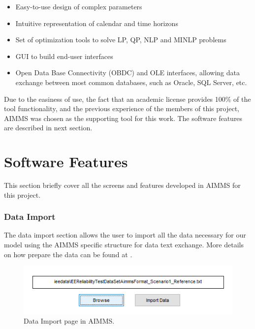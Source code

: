 \documentclass[12pt,LUDisStyle,twosided]{book}
\begin{document}
\begin{itemize}
\item Easy-to-use design of complex parameters
\item Intuitive representation of calendar and time horizons
\item Set of optimization tools to solve LP, QP, NLP and MINLP problems
\item GUI to build end-user interfaces
\item Open Data Base Connectivity (OBDC) and OLE interfaces, allowing data exchange between most common databases, such as Oracle, SQL Server, etc.
\end{itemize}

Due to the easiness of use, the fact that an academic license provides 100\% of the tool functionality, and the previous experience of the members of this project, AIMMS was chosen as the supporting tool for this work. The software features are described in next section.

\section{Software Features}

This section briefly cover all the screens and features developed in AIMMS for this project.

\subsubsection{Data Import}

The data import section allows the user to import all the data necessary for our model using the AIMMS specific structure for data text exchange. More details on how prepare the data can be found at \cite{bisschop}.

\begin{figure}[H] 
	\begin{center}
		\includegraphics[keepaspectratio]{aimmsScreenImportPage.png}
	  	\caption{Data Import page in AIMMS.}
     	\label{fig:aimmsScreenImportPage}
	\end{center}
\end{figure}
\end{document}
